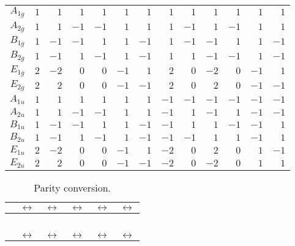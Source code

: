 \documentclass[fleqn,10pt,landscape]{article}
\begin{document}
\begin{itemize}
\begin{center}
\begin{longtable}{c|rrrrrrrrrrrr}
$ A_{1g} $ & $ 1 $ & $ 1 $ & $ 1 $ & $ 1 $ & $ 1 $ & $ 1 $ & $ 1 $ & $ 1 $ & $ 1 $ & $ 1 $ & $ 1 $ & $ 1 $ \\
$ A_{2g} $ & $ 1 $ & $ 1 $ & $ -1 $ & $ -1 $ & $ 1 $ & $ 1 $ & $ 1 $ & $ -1 $ & $ 1 $ & $ -1 $ & $ 1 $ & $ 1 $ \\
$ B_{1g} $ & $ 1 $ & $ -1 $ & $ -1 $ & $ 1 $ & $ 1 $ & $ -1 $ & $ 1 $ & $ -1 $ & $ -1 $ & $ 1 $ & $ 1 $ & $ -1 $ \\
$ B_{2g} $ & $ 1 $ & $ -1 $ & $ 1 $ & $ -1 $ & $ 1 $ & $ -1 $ & $ 1 $ & $ 1 $ & $ -1 $ & $ -1 $ & $ 1 $ & $ -1 $ \\
$ E_{1g} $ & $ 2 $ & $ -2 $ & $ 0 $ & $ 0 $ & $ -1 $ & $ 1 $ & $ 2 $ & $ 0 $ & $ -2 $ & $ 0 $ & $ -1 $ & $ 1 $ \\
$ E_{2g} $ & $ 2 $ & $ 2 $ & $ 0 $ & $ 0 $ & $ -1 $ & $ -1 $ & $ 2 $ & $ 0 $ & $ 2 $ & $ 0 $ & $ -1 $ & $ -1 $ \\
$ A_{1u} $ & $ 1 $ & $ 1 $ & $ 1 $ & $ 1 $ & $ 1 $ & $ 1 $ & $ -1 $ & $ -1 $ & $ -1 $ & $ -1 $ & $ -1 $ & $ -1 $ \\
$ A_{2u} $ & $ 1 $ & $ 1 $ & $ -1 $ & $ -1 $ & $ 1 $ & $ 1 $ & $ -1 $ & $ 1 $ & $ -1 $ & $ 1 $ & $ -1 $ & $ -1 $ \\
$ B_{1u} $ & $ 1 $ & $ -1 $ & $ -1 $ & $ 1 $ & $ 1 $ & $ -1 $ & $ -1 $ & $ 1 $ & $ 1 $ & $ -1 $ & $ -1 $ & $ 1 $ \\
$ B_{2u} $ & $ 1 $ & $ -1 $ & $ 1 $ & $ -1 $ & $ 1 $ & $ -1 $ & $ -1 $ & $ -1 $ & $ 1 $ & $ 1 $ & $ -1 $ & $ 1 $ \\
$ E_{1u} $ & $ 2 $ & $ -2 $ & $ 0 $ & $ 0 $ & $ -1 $ & $ 1 $ & $ -2 $ & $ 0 $ & $ 2 $ & $ 0 $ & $ 1 $ & $ -1 $ \\
$ E_{2u} $ & $ 2 $ & $ 2 $ & $ 0 $ & $ 0 $ & $ -1 $ & $ -1 $ & $ -2 $ & $ 0 $ & $ -2 $ & $ 0 $ & $ 1 $ & $ 1 $ \\
\end{longtable}
\end{center}
\begin{center}
\renewcommand{\arraystretch}{1.0}
\begin{longtable}{cccccc}
\caption{Parity conversion.}
 \\
 \hline \hline
 & $\leftrightarrow$ & $\leftrightarrow$ & $\leftrightarrow$ & $\leftrightarrow$ & $\leftrightarrow$ \\ \hline \endfirsthead

\multicolumn{5}{l}{\tablename\ \thetable{}} \\
 \hline \hline
 & $\leftrightarrow$ & $\leftrightarrow$ & $\leftrightarrow$ & $\leftrightarrow$ & $\leftrightarrow$ \\ \hline \endhead


\end{longtable}
\end{center}
\end{itemize}
\end{document}
